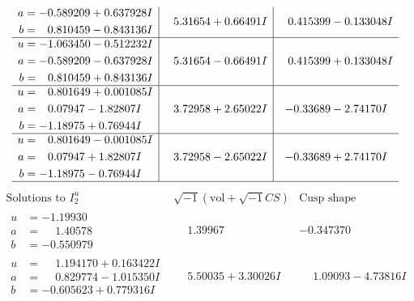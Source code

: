 \documentclass[1p]{elsarticle_modified}
\theoremstyle{definition}
\newcommand{\I}{\sqrt{-1}}
\begin{document}
$$\begin{array}{c|c|c}
\begin{aligned}
a &= -0.589209 + 0.637928 I \\
b &= \phantom{-}0.810459 - 0.843136 I\end{aligned}
 & \phantom{-}5.31654 + 0.66491 I & \phantom{-}0.415399 - 0.133048 I \\ \hline\begin{aligned}
u &= -1.063450 - 0.512232 I \\
a &= -0.589209 - 0.637928 I \\
b &= \phantom{-}0.810459 + 0.843136 I\end{aligned}
 & \phantom{-}5.31654 - 0.66491 I & \phantom{-}0.415399 + 0.133048 I \\ \hline\begin{aligned}
u &= \phantom{-}0.801649 + 0.001085 I \\
a &= \phantom{-}0.07947 - 1.82807 I \\
b &= -1.18975 + 0.76944 I\end{aligned}
 & \phantom{-}3.72958 + 2.65022 I & -0.33689 - 2.74170 I \\ \hline\begin{aligned}
u &= \phantom{-}0.801649 - 0.001085 I \\
a &= \phantom{-}0.07947 + 1.82807 I \\
b &= -1.18975 - 0.76944 I\end{aligned}
 & \phantom{-}3.72958 - 2.65022 I & -0.33689 + 2.74170 I\\
 \hline 
 \end{array}$$\newpage$$\begin{array}{c|c|c}  
\text{Solutions to }I^u_{2}& \I (\text{vol} + \sqrt{-1}CS) & \text{Cusp shape}\\
 \hline 
\begin{aligned}
u &= -1.19930\phantom{ +0.000000I} \\
a &= \phantom{-}1.40578\phantom{ +0.000000I} \\
b &= -0.550979\phantom{ +0.000000I}\end{aligned}
 & \phantom{-}1.39967\phantom{ +0.000000I} & -0.347370\phantom{ +0.000000I} \\ \hline\begin{aligned}
u &= \phantom{-}1.194170 + 0.163422 I \\
a &= \phantom{-}0.829774 - 1.015350 I \\
b &= -0.605623 + 0.779316 I\end{aligned}
 & \phantom{-}5.50035 + 3.30026 I & \phantom{-}1.09093 - 4.73816 I \\ \hline\begin{aligned}

\end{aligned}
\end{array}$$
\end{document}
